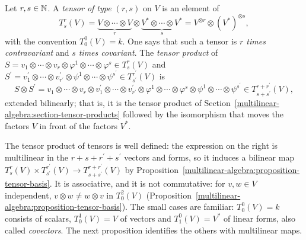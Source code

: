 \begin{definition}\label{multilinear-algebra:definition-tensor-type}
Let $r, s \in \mathbb{N}$. A \emph{tensor of type $(r,s)$} on $V$ is an element of
\[
T^r_s(V) = \underbrace{V \otimes \cdots \otimes V}_{r} \otimes \underbrace{V^* \otimes \cdots \otimes V^*}_{s} = V^{\otimes r} \otimes (V^*)^{\otimes s},
\]
with the convention $T^0_0(V) = k$. One says that such a tensor is \emph{$r$ times contravariant} and \emph{$s$ times covariant}. The \emph{tensor product} of
$S = v_1 \otimes \cdots \otimes v_r \otimes \varphi^1 \otimes \cdots \otimes \varphi^s \in T^r_s(V)$ and $S^{\prime} = v^{\prime}_1 \otimes \cdots \otimes v^{\prime}_{r^{\prime}}
\otimes \psi^1 \otimes \cdots \otimes \psi^{s^{\prime}} \in T^{r^{\prime}}_{s^{\prime}}(V)$ is
\[
S \otimes S^{\prime} = v_1 \otimes \cdots \otimes v_r \otimes v^{\prime}_1 \otimes \cdots \otimes v^{\prime}_{r^{\prime}} \otimes \varphi^1 \otimes \cdots \otimes \varphi^s \otimes \psi^1 \otimes \cdots
\otimes \psi^{s^{\prime}} \in T^{r + r^{\prime}}_{s + s^{\prime}}(V),
\]
extended bilinearly; that is, it is the tensor product of Section~\ref{multilinear-algebra:section-tensor-products} followed by the isomorphism that moves the
factors $V$ in front of the factors $V^*$.
\end{definition}

The tensor product of tensors is well defined: the expression on the right is multilinear in the $r + s + r^{\prime} + s^{\prime}$ vectors and forms, so it induces a
bilinear map $T^r_s(V) \times T^{r^{\prime}}_{s^{\prime}}(V) \to T^{r + r^{\prime}}_{s + s^{\prime}}(V)$ by Proposition~\ref{multilinear-algebra:proposition-tensor-basis}. It is associative,
and it is not commutative: for $v, w \in V$ independent, $v \otimes w \neq w \otimes v$ in $T^2_0(V)$ (Proposition~\ref{multilinear-algebra:proposition-tensor-basis}).
The small cases are familiar: $T^0_0(V) = k$ consists of scalars, $T^1_0(V) = V$ of vectors and $T^0_1(V) = V^*$ of linear forms, also called \emph{covectors}.
The next proposition identifies the others with multilinear maps.

